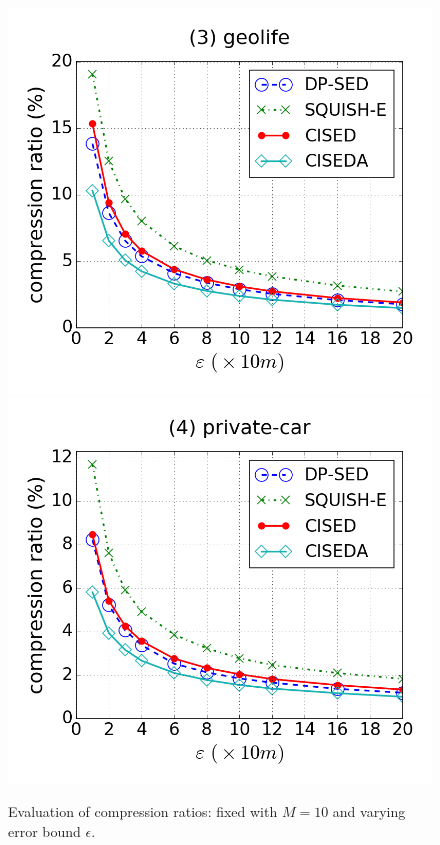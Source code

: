 {\begin{figure}[tb!]
\includegraphics[scale = 0.245]{figures/Exp-cr-epsilon-geolife.png}
\includegraphics[scale = 0.245]{figures/Exp-cr-epsilon-private.png}
\vspace{-3ex}
\caption{\small Evaluation of compression ratios: fixed with $M=10$ and varying error bound $\epsilon$.}
\label{fig:cr-m10}
\vspace{-1.0ex}
\end{figure}
}%



